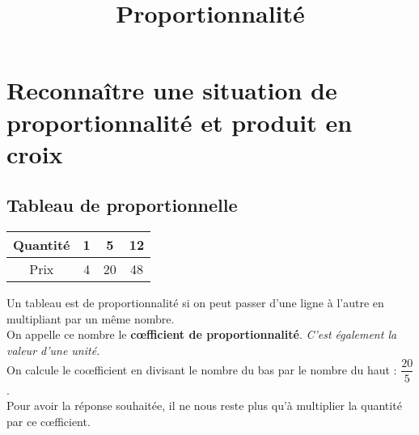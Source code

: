 \documentclass[paper=a4, fontsize=9pt]{scrartcl} %
\title{
  \vspace{-10ex}
  \horrule{0.5pt} %
  \huge Proportionnalité\\
  \horrule{2pt}
}
\author{}
\date{\vspace{-10ex}} %
\begin{document}

\newtheorem{Definition}{Définition}
\newtheorem{Theorem}{Théorème}
\newtheorem{Proposition}{Propriété}

\renewcommand{\labelitemi}{$\bullet$}
\renewcommand{\labelitemii}{$\circ$}

\maketitle %
\setlength{\columnseprule}{1pt}

\section{Reconnaître une situation de proportionnalité et produit en croix}

\begin{multicols}{2}

  \subsection{Tableau de proportionnelle}


  \begin{center}
    \begin{tabular}{| c || c | c | c|}
      \hline
      Quantité & 1 & 5  & 12\\
      \hline
      Prix     & 4 & 20 & 48\\ 
      \hline
    \end{tabular}
  \end{center}


  Un tableau est de proportionnalité si on peut passer d'une ligne à l'autre en multipliant par un même nombre. \\
  On appelle ce nombre le \textbf{cœfficient de proportionnalité}. \textit{C'est également la valeur d'une unité.}\\

  On calcule le coœfficient en divisant le nombre du bas par le nombre du haut : $\dfrac{20}{5}$.\\
  Pour avoir la réponse souhaitée, il ne nous reste plus qu'à multiplier la quantité par ce cœfficient.

\end{multicols}
\end{document}
